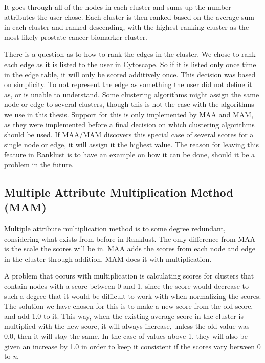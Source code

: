 It goes through all of the nodes in each cluster and sums up the number-
attributes the user chose. Each cluster is then ranked based on the average sum
in each cluster and ranked descending, with the highest ranking cluster as the
most likely prostate cancer biomarker cluster.

There is a question as to how to rank the edges in the cluster. We chose to rank
each edge as it is listed to the user in Cytoscape. So if it is listed only once
time in the edge table, it will only be scored additively once. This decision
was based on simplicity. To not represent the edge as something the user did not
define it as, or is unable to understand. Some clustering algorithms might
assign the same node or edge to several clusters, though this is not the case
with the algorithms we use in this thesis. Support for this is only implemented
by MAA and MAM, as they were implemented before a final decision on which
clustering algorithms should be used. If MAA/MAM discovers this special case of
several scores for a single node or edge, it will assign it the highest value.
The reason for leaving this feature in Ranklust is to have an example on how it
can be done, should it be a problem in the future.

\subsection{Multiple Attribute Multiplication Method (MAM)}
Multiple attribute multiplication method is to some degree redundant,
considering what exists from before in Ranklust. The only difference from MAA is
the scale the scores will be in. MAA adds the scores from each node and edge in
the cluster through addition, MAM does it with multiplication.

A problem that occurs with multiplication is calculating scores for clusters
that contain nodes with a score between 0 and 1, since the score would decrease
to such a degree that it would be difficult to work with when normalizing the
scores. The solution we have chosen for this is to make a new score from the
old score, and add 1.0 to it. This way, when the existing average score in the
cluster is multiplied with the new score, it will always increase, unless the
old value was 0.0, then it will stay the same. In the case of values above 1,
they will also be given an increase by 1.0 in order to keep it consistent if the
scores vary between 0 to \textit{n}. %

